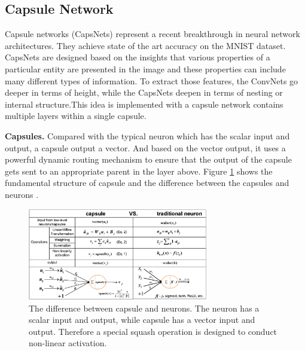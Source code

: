 \documentclass{article} %
\begin{document}
\subsection{Capsule Network}
Capsule networks (CapsNets) \cite{capsnet} represent a recent breakthrough in neural network architectures.  They achieve state of the art accuracy on the MNIST dataset. CapsNets are designed based on the insights that various properties of a particular entity are presented in the image and these properties can include many different types of information. To extract those features, the  ConvNets go deeper in terms of height, while the CapsNets deepen in terms of nesting or internal structure.This idea is implemented with a capsule network contains multiple layers within a single capsule.

\textbf{Capsules.} Compared with the typical neuron which has the scalar input and output,  a capsule 
output a vector. And based on the vector output, it uses a powerful dynamic routing mechanism to ensure that the output of the capsule gets sent to an appropriate parent in the layer above. 
Figure \ref{capsule} shows the fundamental structure of capsule and the difference between the capsules and neurons . 
\begin{figure}[htbp]
	\centering
	\includegraphics[width=0.7\textwidth]{figs/capsule.png}
	\caption{The difference between capsule and neurons. The neuron has a scalar input and output, while capsule has a vector input and output. Therefore a special squash operation is designed to conduct non-linear activation.}
	\label{capsule}
\end{figure}
\end{document}
